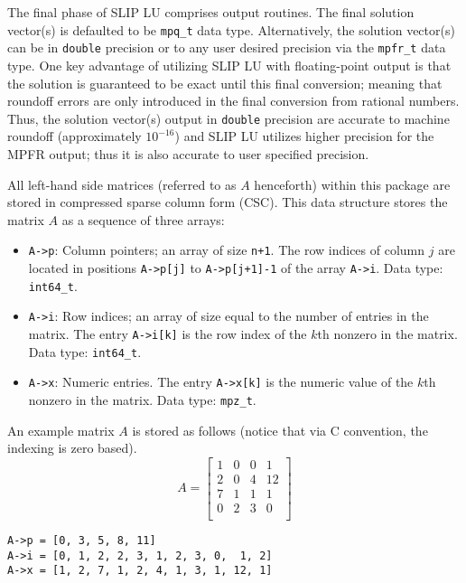 \documentclass[12pt]{article}
\theoremstyle{definition}
\begin{document}
The final phase of SLIP LU comprises output routines. The final solution vector(s) is defaulted to be \verb|mpq_t| data type. Alternatively, the solution vector(s) can be in \verb|double| precision
or to any user desired precision via the \verb|mpfr_t| data type. One key
advantage of utilizing SLIP LU with floating-point output is that the solution
is guaranteed to be exact until this final conversion; meaning that roundoff
errors are only introduced in the final conversion from rational numbers. Thus,
the solution vector(s) output in \verb|double| precision are accurate to machine
roundoff (approximately $10^{-16}$) and SLIP LU utilizes higher precision for
the MPFR output; thus it is also accurate to user specified precision.

All left-hand side matrices (referred to as $A$ henceforth) within this package
are stored in compressed sparse column form (CSC). This data structure
stores the matrix $A$ as a sequence of three arrays:

\begin{itemize}
\item
\verb|A->p|: Column pointers; an array of size \verb|n+1|. The row indices of
column $j$ are located in positions \verb|A->p[j]| to \verb|A->p[j+1]-1| of the
array \verb|A->i|. Data type: \verb|int64_t|.

\item
\verb|A->i|: Row indices; an array of size equal to the number of entries in
the matrix. The entry \verb|A->i[k]| is the row index of the $k$th nonzero in
the matrix. Data type: \verb|int64_t|.

\item
\verb|A->x|: Numeric entries. The entry \verb|A->x[k]| is the numeric value of
the $k$th nonzero in the matrix. Data type: \verb|mpz_t|.
\end{itemize}

An example matrix $A$ is stored as follows (notice that via C convention, the
indexing is zero based).
\[
A = \begin{bmatrix}
1 & 0 & 0 & 1 \\
2 & 0 & 4 & 12 \\
7 & 1 & 1 & 1 \\
0 & 2 & 3 & 0 \\
\end{bmatrix}
\]

{\small
\noindent \verb|A->p = [0, 3, 5, 8, 11]| \\
\verb|A->i = [0, 1, 2, 2, 3, 1, 2, 3, 0,  1, 2]| \\
\verb|A->x = [1, 2, 7, 1, 2, 4, 1, 3, 1, 12, 1]|
}
\end{document}
